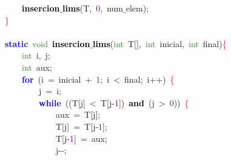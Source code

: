 \mbox{}\ \ \ \ \textbf{\textcolor{Black}{insercion$\_$lims}}\textcolor{BrickRed}{(}T\textcolor{BrickRed}{,}\ \textcolor{Purple}{0}\textcolor{BrickRed}{,}\ num$\_$elem\textcolor{BrickRed}{);} \\
\mbox{}\textcolor{Red}{\}} \\
\mbox{} \\
\mbox{}\textbf{\textcolor{Blue}{static}}\ \textcolor{ForestGreen}{void}\ \textbf{\textcolor{Black}{insercion$\_$lims}}\textcolor{BrickRed}{(}\textcolor{ForestGreen}{int}\ T\textcolor{BrickRed}{[],}\ \textcolor{ForestGreen}{int}\ inicial\textcolor{BrickRed}{,}\ \textcolor{ForestGreen}{int}\ final\textcolor{BrickRed}{)}\textcolor{Red}{\{} \\
\mbox{}\ \ \ \ \textcolor{ForestGreen}{int}\ i\textcolor{BrickRed}{,}\ j\textcolor{BrickRed}{;} \\
\mbox{}\ \ \ \ \textcolor{ForestGreen}{int}\ aux\textcolor{BrickRed}{;} \\
\mbox{}\ \ \ \ \textbf{\textcolor{Blue}{for}}\ \textcolor{BrickRed}{(}i\ \textcolor{BrickRed}{=}\ inicial\ \textcolor{BrickRed}{+}\ \textcolor{Purple}{1}\textcolor{BrickRed}{;}\ i\ \textcolor{BrickRed}{\textless{}}\ final\textcolor{BrickRed}{;}\ i\textcolor{BrickRed}{++)}\ \textcolor{Red}{\{} \\
\mbox{}\ \ \ \ \ \ \ \ j\ \textcolor{BrickRed}{=}\ i\textcolor{BrickRed}{;} \\
\mbox{}\ \ \ \ \ \ \ \ \textbf{\textcolor{Blue}{while}}\ \textcolor{BrickRed}{((}T\textcolor{BrickRed}{[}j\textcolor{BrickRed}{]}\ \textcolor{BrickRed}{\textless{}}\ T\textcolor{BrickRed}{[}j\textcolor{BrickRed}{-}\textcolor{Purple}{1}\textcolor{BrickRed}{])}\ \textbf{\textcolor{Black}{and}}\ \textcolor{BrickRed}{(}j\ \textcolor{BrickRed}{\textgreater{}}\ \textcolor{Purple}{0}\textcolor{BrickRed}{))}\ \textcolor{Red}{\{} \\
\mbox{}\ \ \ \ \ \ \ \ \ \ \ \ aux\ \textcolor{BrickRed}{=}\ T\textcolor{BrickRed}{[}j\textcolor{BrickRed}{];} \\
\mbox{}\ \ \ \ \ \ \ \ \ \ \ \ T\textcolor{BrickRed}{[}j\textcolor{BrickRed}{]}\ \textcolor{BrickRed}{=}\ T\textcolor{BrickRed}{[}j\textcolor{BrickRed}{-}\textcolor{Purple}{1}\textcolor{BrickRed}{];} \\
\mbox{}\ \ \ \ \ \ \ \ \ \ \ \ T\textcolor{BrickRed}{[}j\textcolor{BrickRed}{-}\textcolor{Purple}{1}\textcolor{BrickRed}{]}\ \textcolor{BrickRed}{=}\ aux\textcolor{BrickRed}{;} \\
\mbox{}\ \ \ \ \ \ \ \ \ \ \ \ j\textcolor{BrickRed}{-\/-;} \\
